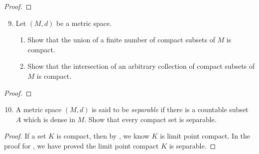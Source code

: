 \documentclass{report}
\begin{document}
\begin{proof}

\end{proof}
\begin{question}{}{}
\begin{enumerate}
    \setcounter{enumi}{8}
    \item Let \( (M, d) \) be a metric space.
    \begin{enumerate}
        \item Show that the union of a finite number of compact subsets of \( M \) is compact.
        \item Show that the intersection of an arbitrary collection of compact subsets of \( M \) is compact.
    \end{enumerate}
\end{enumerate}
\end{question}
\begin{proof}

\end{proof}
\begin{question}{}{}
\begin{enumerate}
    \setcounter{enumi}{9}
    \item A metric space \( (M,d) \) is said to be \textit{separable} if there is a countable subset \( A \) which is dense in \( M \). Show that every compact set is separable.
\end{enumerate}
\end{question}
\begin{proof}
If a set $K$ is compact, then by , we know $K$ is limit point compact. In the proof for , we have proved the limit point compact $K$ is separable.
\end{proof}
\end{document}
